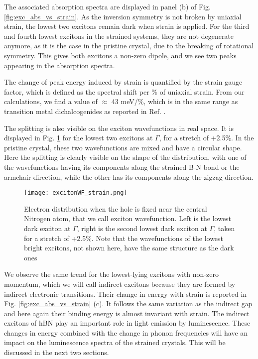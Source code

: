 The associated absorption spectra are displayed in panel (b) of Fig. \ref{fig:exc_abs_vs_strain}. As the inversion symmetry is not broken by uniaxial strain, the lowest two excitons remain dark when strain is applied. For the third and fourth lowest excitons in the strained systems, they are not degenerate anymore, as it is the case in the pristine crystal, due to the breaking of rotational symmetry. This gives both excitons a non-zero dipole, and we see two peaks appearing in the absorption spectra. 

The change of peak energy induced by strain is quantified by the strain gauge factor, which is defined as the spectral shift per \% of uniaxial strain. From our calculations, we find a value of $\approx$ 43 meV/\%, which is in the same range as transition metal dichalcogenides as reported in Ref. \cite{carrascoso2021strain}.

The splitting is also visible on the exciton wavefunctions in real space. It is displayed in Fig. \ref{fig:excWF_strain} for the lowest two excitons at $\Gamma$, for a stretch of +2.5\%. In the pristine crystal, these two wavefunctions are mixed and have a circular shape. Here the splitting is clearly visible on the shape of the distribution, with one of the wavefunctions having its components along the strained B-N bond or the armchair direction, while the other has its components along the zigzag direction.
\begin{figure}[h!tb]
	\vspace{0.2cm}
	\setcapindent{2em}
	\centering
	\texttt{[image: excitonWF\_strain.png]}
	\caption{Electron distribution when the hole is fixed near the central Nitrogen atom, that we call exciton wavefunction. Left is the lowest dark exciton at $\Gamma$, right is the second lowest dark exciton at $\Gamma$, taken for a stretch of +2.5\%. Note that the wavefunctions of the lowest bright excitons, not shown here, have the same structure as the dark ones}
	\label{fig:excWF_strain}
\end{figure}

We observe the same trend for the lowest-lying excitons with non-zero momentum, which we will call indirect excitons because they are formed by indirect electronic transitions. Their change in energy with strain is reported in Fig. \ref{fig:exc_abs_vs_strain} (c). It follows the same variation as the indirect gap and here again their binding energy is almost invariant with strain. The indirect excitons of hBN play an important role in light emission by luminescence. These changes in energy combined with the change in phonon frequencies will have an impact on the luminescence spectra of the strained crystals. This will be discussed in the next two sections.

